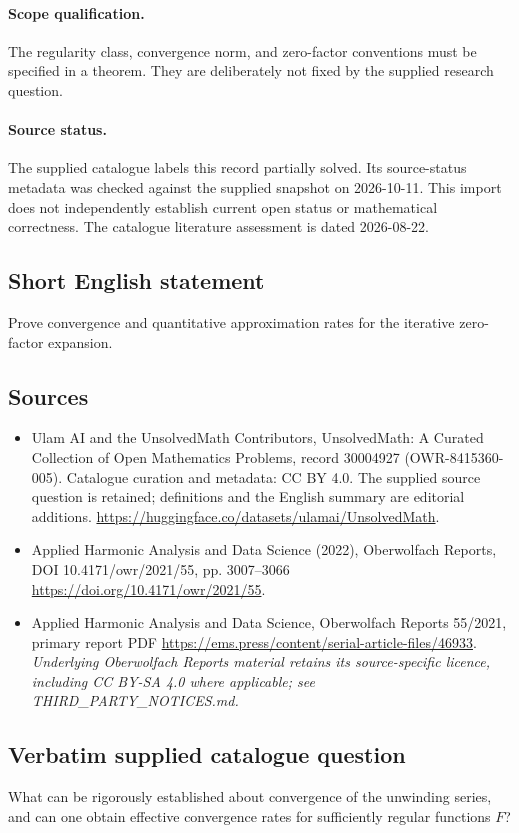\documentclass[11pt]{article}
\begin{document}
\paragraph{Scope qualification.}
The regularity class, convergence norm, and zero-factor conventions must be specified in a theorem. They are deliberately not fixed by the supplied research question.
\paragraph{Source status.}
The supplied catalogue labels this record partially solved. Its source-status metadata was checked against the supplied snapshot on 2026-10-11. This import does not independently establish current open status or mathematical correctness. The catalogue literature assessment is dated 2026-08-22.
\subsection{Short English statement}
Prove convergence and quantitative approximation rates for the iterative zero-factor expansion.
\subsection{Sources}
\begin{itemize}
\item[S1] Ulam AI and the UnsolvedMath Contributors, UnsolvedMath: A Curated Collection of Open Mathematics Problems, record 30004927 (OWR-8415360-005). Catalogue curation and metadata: CC BY 4.0. The supplied source question is retained; definitions and the English summary are editorial additions.
\url{https://huggingface.co/datasets/ulamai/UnsolvedMath}.
\item[S2] Applied Harmonic Analysis and Data Science (2022), Oberwolfach Reports, DOI 10.4171/owr/2021/55, pp. 3007--3066
\url{https://doi.org/10.4171/owr/2021/55}.
\item[S3] Applied Harmonic Analysis and Data Science, Oberwolfach Reports 55/2021, primary report PDF
\url{https://ems.press/content/serial-article-files/46933}.
\textit{Underlying Oberwolfach Reports material retains its source-specific licence, including CC BY-SA 4.0 where applicable; see THIRD\_PARTY\_NOTICES.md.}
\end{itemize}
\subsection{Verbatim supplied catalogue question}
What can be rigorously established about convergence of the unwinding series, and can one obtain effective convergence rates for sufficiently regular functions $F$?
\end{document}
